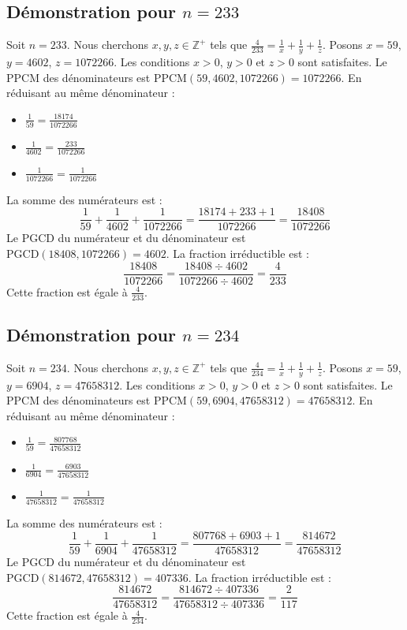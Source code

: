 \documentclass[11pt,a4paper]{article}
\begin{document}
\subsection{Démonstration pour $n = 233$}
Soit $n = 233$. Nous cherchons $x, y, z \in \mathbb{Z}^{+}$ tels que $\frac{4}{233} = \frac{1}{x} + \frac{1}{y} + \frac{1}{z}$.
Posons $x = 59$, $y = 4602$, $z = 1072266$.
Les conditions $x > 0$, $y > 0$ et $z > 0$ sont satisfaites.
Le PPCM des dénominateurs est $\text{PPCM}(59, 4602, 1072266) = 1072266$.
En réduisant au même dénominateur :
\begin{itemize}
    \item $\frac{1}{59} = \frac{18174}{1072266}$
    \item $\frac{1}{4602} = \frac{233}{1072266}$
    \item $\frac{1}{1072266} = \frac{1}{1072266}$
\end{itemize}
La somme des numérateurs est :
$$ \frac{1}{59} + \frac{1}{4602} + \frac{1}{1072266} = \frac{18174 + 233 + 1}{1072266} = \frac{18408}{1072266} $$
Le PGCD du numérateur et du dénominateur est $\text{PGCD}(18408, 1072266) = 4602$.
La fraction irréductible est :
$$ \frac{18408}{1072266} = \frac{18408 \div 4602}{1072266 \div 4602} = \frac{4}{233} $$
Cette fraction est égale à $\frac{4}{233}$.

\subsection{Démonstration pour $n = 234$}
Soit $n = 234$. Nous cherchons $x, y, z \in \mathbb{Z}^{+}$ tels que $\frac{4}{234} = \frac{1}{x} + \frac{1}{y} + \frac{1}{z}$.
Posons $x = 59$, $y = 6904$, $z = 47658312$.
Les conditions $x > 0$, $y > 0$ et $z > 0$ sont satisfaites.
Le PPCM des dénominateurs est $\text{PPCM}(59, 6904, 47658312) = 47658312$.
En réduisant au même dénominateur :
\begin{itemize}
    \item $\frac{1}{59} = \frac{807768}{47658312}$
    \item $\frac{1}{6904} = \frac{6903}{47658312}$
    \item $\frac{1}{47658312} = \frac{1}{47658312}$
\end{itemize}
La somme des numérateurs est :
$$ \frac{1}{59} + \frac{1}{6904} + \frac{1}{47658312} = \frac{807768 + 6903 + 1}{47658312} = \frac{814672}{47658312} $$
Le PGCD du numérateur et du dénominateur est $\text{PGCD}(814672, 47658312) = 407336$.
La fraction irréductible est :
$$ \frac{814672}{47658312} = \frac{814672 \div 407336}{47658312 \div 407336} = \frac{2}{117} $$
Cette fraction est égale à $\frac{4}{234}$.
\end{document}
